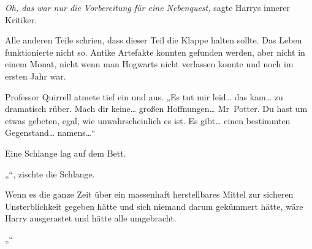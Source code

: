\emph{Oh, das war nur die Vorbereitung für eine Nebenquest,} sagte Harrys innerer Kritiker.

Alle anderen Teile schrien, dass dieser Teil die Klappe halten sollte. Das Leben funktionierte nicht so. Antike Artefakte konnten gefunden werden, aber nicht in einem Monat, nicht wenn man Hogwarts nicht verlassen konnte und noch im ersten Jahr war.

Professor Quirrell atmete tief ein und aus.
„Es tut mir leid… das kam… zu dramatisch rüber. Mach dir keine… großen Hoffnungen… Mr~Potter. Du hast um etwas gebeten, egal, wie unwahrscheinlich es ist. Es gibt… einen bestimmten Gegenstand… namens…“

Eine Schlange lag auf dem Bett.

„“, zischte die Schlange.

Wenn es die ganze Zeit über ein massenhaft herstellbares Mittel zur sicheren Unsterblichkeit gegeben hätte und sich niemand darum gekümmert hätte, wäre Harry ausgerastet und hätte alle umgebracht.

„“

